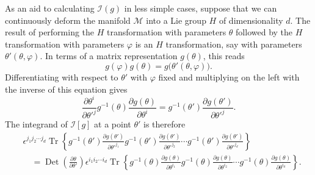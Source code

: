 As an aid to calculating $\mathcal I(g)$ in less simple cases, suppose
that we can continuously deform the manifold $\mathcal M$ into a Lie
group $H$ of dimensionality $d$. The result of performing the $H$
transformation with parameters $\theta$ followed by the $H$
transformation with parameters $\varphi$ is an $H$ transformation, say
with parameters $\theta'(\theta,\varphi)$. In terms of a matrix
representation $g(\theta)$, this reads
\[
g(\varphi)g(\theta)=g\bigl(\theta'(\theta,\varphi)\bigr).
\]
Differentiating with respect to $\theta'$ with $\varphi$ fixed and
multiplying on the left with the inverse of this equation gives
\[
\frac{\partial\theta^i}{\partial\theta'^j}
g^{-1}(\theta)\frac{\partial g(\theta)}{\partial\theta^i}
=g^{-1}(\theta')\frac{\partial g(\theta')}{\partial\theta'^j}.
\]
The integrand of $\mathcal I[g]$ at a point $\theta'$ is therefore
\begin{align*}
&\epsilon^{j_1j_2\cdots j_d}\operatorname{Tr}\left\{
g^{-1}(\theta')\frac{\partial g(\theta')}{\partial\theta'^{j_1}}
g^{-1}(\theta')\frac{\partial g(\theta')}{\partial\theta'^{j_2}}
\cdots
g^{-1}(\theta')\frac{\partial g(\theta')}{\partial\theta'^{j_d}}
\right\}
\\
&\quad=\operatorname{Det}\left(\frac{\partial\theta}
{\partial\theta'}\right)
\epsilon^{i_1i_2\cdots i_d}\operatorname{Tr}\left\{
g^{-1}(\theta)\frac{\partial g(\theta)}{\partial\theta^{i_1}}
g^{-1}(\theta)\frac{\partial g(\theta)}{\partial\theta^{i_2}}
\cdots
g^{-1}(\theta)\frac{\partial g(\theta)}{\partial\theta^{i_d}}
\right\}.
\end{align*}

